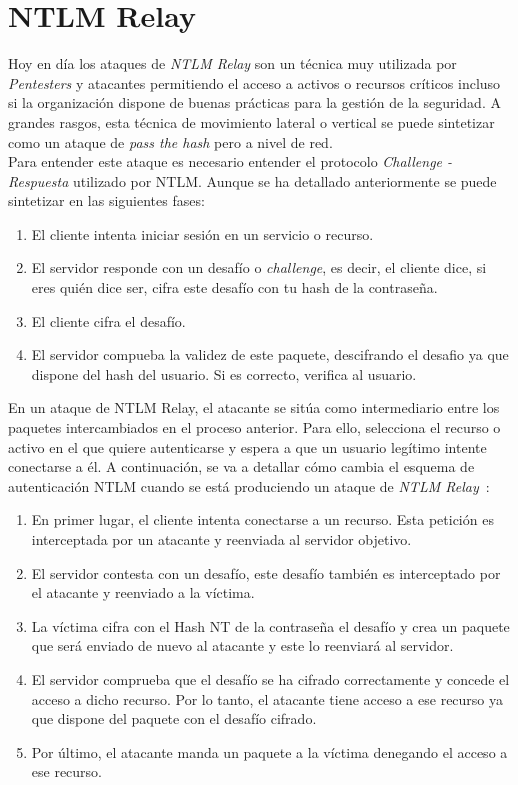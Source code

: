 \begin{enumerate}
\end{enumerate}

\section{NTLM Relay}

Hoy en día los ataques de {\it NTLM Relay} son un técnica muy utilizada por {\it Pentesters} y atacantes permitiendo el acceso a activos o recursos críticos incluso si la organización dispone de buenas prácticas para la gestión de la seguridad. A grandes rasgos, esta técnica de movimiento lateral o vertical se puede sintetizar como un ataque de {\it pass the hash} pero a nivel de red. \\ 


Para entender este ataque es necesario entender el protocolo {\it Challenge - Respuesta} utilizado por NTLM. Aunque se ha detallado anteriormente se puede sintetizar en las siguientes fases: 

\begin{enumerate}
\item El cliente intenta iniciar sesión en un servicio o recurso.
\item El servidor responde con un desafío o {\it challenge}, es decir, el cliente dice, si eres quién dice ser, cifra este desafío con tu hash de la contraseña.
\item El cliente cifra el desafío.
\item El servidor compueba la validez de este paquete, descifrando  el desafio ya que dispone del hash del usuario. Si es correcto, verifica al usuario. 
\end{enumerate}

En un ataque de NTLM Relay, el atacante se sitúa como intermediario entre los paquetes intercambiados en el proceso anterior. Para ello, selecciona el recurso o activo en el que quiere autenticarse y espera a que un usuario legítimo intente conectarse a él. A continuación, se va a detallar cómo cambia el esquema de autenticación NTLM cuando se está produciendo un ataque de {\it NTLM Relay}~\cite{Capitulo5:NTLMRelay}:

\begin{enumerate}
\item En primer lugar, el cliente intenta conectarse a un recurso. Esta petición es interceptada por un atacante y reenviada al servidor objetivo. 
\item El servidor contesta con un desafío, este desafío también es interceptado por el atacante y reenviado a la víctima.
\item La víctima cifra con el Hash NT de la contraseña el desafío y crea un paquete que será enviado de nuevo al atacante y este lo reenviará al servidor. 
\item El servidor comprueba que el desafío se ha cifrado correctamente y concede el acceso a dicho recurso. Por lo tanto, el atacante tiene acceso a ese recurso ya que dispone del paquete con el desafío cifrado. 
\item Por último, el atacante manda un paquete a la víctima denegando el acceso a ese recurso. 
\end{enumerate}

